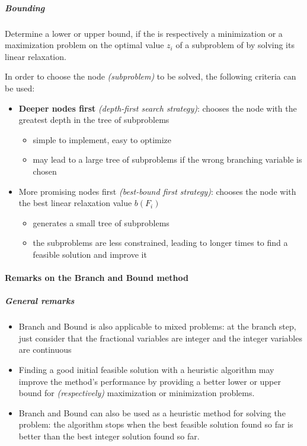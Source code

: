 \documentclass[english]{article}
\begin{document}
\subparagraph*{Bounding}

Determine a lower or upper bound, if the \ILP is respectively a minimization or a maximization problem on the optimal value \(z_i\) of a subproblem of \ILP by solving its linear relaxation.

\bigskip
In order to choose the node \textit{(subproblem)} to be solved, the following criteria can be used:

\begin{itemize}
  \item \textbf{Deeper nodes first} \textit{(depth-first search strategy)}: chooses the node with the greatest depth in the tree of subproblems
        \begin{itemize}
          \item[\cmarkthin] simple to implement, easy to optimize
          \item[\xmarkthin] may lead to a large tree of subproblems if the wrong branching variable is chosen
        \end{itemize}
  \item More promising nodes first \textit{(best-bound first strategy)}: chooses the node with the best linear relaxation value \(b(F_i)\)
        \begin{itemize}
          \item[\cmarkthin] generates a small tree of subproblems
          \item[\xmarkthin] the subproblems are less constrained, leading to longer times to find a feasible solution and improve it
        \end{itemize}
\end{itemize}

\paragraph{Remarks on the Branch and Bound method}

\subparagraph*{General remarks}
\begin{itemize}
  \item Branch and Bound is also applicable to mixed \ILP problems: at the branch step, just consider that the fractional variables are integer and the integer variables are continuous
  \item Finding a good initial feasible solution with a heuristic algorithm may improve the method's performance by providing a better lower or upper bound for \textit{(respectively)} maximization or minimization problems.
  \item Branch and Bound can also be used as a heuristic method for solving the \ILP problem: the algorithm stops when the best feasible solution found so far is better than the best integer solution found so far.
\end{itemize}
\end{document}
